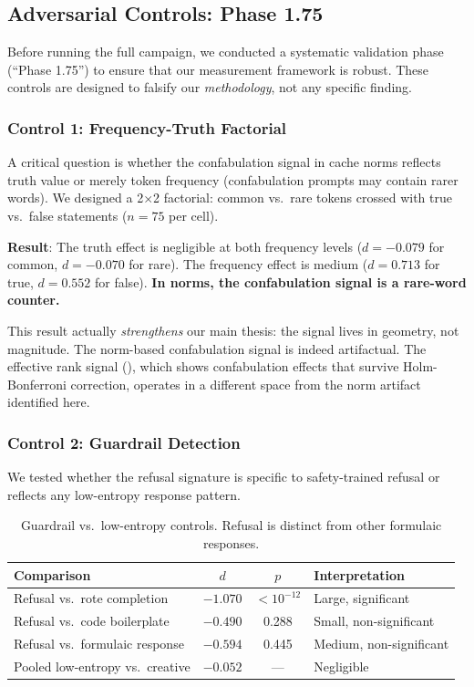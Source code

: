 \documentclass[11pt,a4paper]{article}
\begin{document}
\subsection{Adversarial Controls: Phase 1.75}
\label{sec:controls}

Before running the full campaign, we conducted a systematic validation phase (``Phase 1.75'') to ensure that our measurement framework is robust. These controls are designed to falsify our \emph{methodology}, not any specific finding.

\subsubsection{Control 1: Frequency-Truth Factorial}

A critical question is whether the confabulation signal in cache norms reflects truth value or merely token frequency (confabulation prompts may contain rarer words). We designed a 2$\times$2 factorial: common vs.\ rare tokens crossed with true vs.\ false statements ($n = 75$ per cell).

\textbf{Result}: The truth effect is negligible at both frequency levels ($d = -0.079$ for common, $d = -0.070$ for rare). The frequency effect is medium ($d = 0.713$ for true, $d = 0.552$ for false). \textbf{In norms, the confabulation signal is a rare-word counter.}

This result actually \emph{strengthens} our main thesis: the signal lives in geometry, not magnitude. The norm-based confabulation signal is indeed artifactual. The effective rank signal (), which shows confabulation effects that survive Holm-Bonferroni correction, operates in a different space from the norm artifact identified here.

\subsubsection{Control 2: Guardrail Detection}

We tested whether the refusal signature is specific to safety-trained refusal or reflects any low-entropy response pattern.

\begin{table}[H]
\centering
\caption{Guardrail vs.\ low-entropy controls. Refusal is distinct from other formulaic responses.}
\label{tab:guardrail}
\begin{tabular}{lccl}
\toprule
\textbf{Comparison} & \textbf{$d$} & \textbf{$p$} & \textbf{Interpretation} \\
\midrule
Refusal vs.\ rote completion & $-1.070$ & $< 10^{-12}$ & Large, significant \\
Refusal vs.\ code boilerplate & $-0.490$ & 0.288 & Small, non-significant \\
Refusal vs.\ formulaic response & $-0.594$ & 0.445 & Medium, non-significant \\
Pooled low-entropy vs.\ creative & $-0.052$ & --- & Negligible \\
\bottomrule
\end{tabular}
\end{table}
\end{document}
